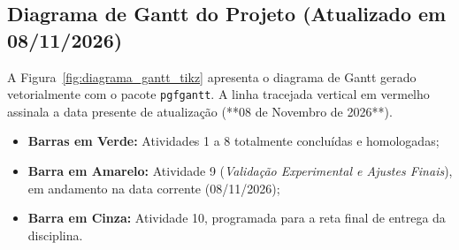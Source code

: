 \documentclass[12pt,a4paper]{article}
\begin{document}
\subsection{Diagrama de Gantt do Projeto (Atualizado em 08/11/2026)}
A Figura~\ref{fig:diagrama_gantt_tikz} apresenta o diagrama de Gantt gerado vetorialmente com o pacote \texttt{pgfgantt}. A linha tracejada vertical em vermelho assinala a data presente de atualização (**08 de Novembro de 2026**). 
\begin{itemize}
	\item \textbf{Barras em Verde:} Atividades 1 a 8 totalmente concluídas e homologadas;
	\item \textbf{Barra em Amarelo:} Atividade 9 (\textit{Validação Experimental e Ajustes Finais}), em andamento na data corrente (08/11/2026);
	\item \textbf{Barra em Cinza:} Atividade 10, programada para a reta final de entrega da disciplina.
\end{itemize}
\end{document}
